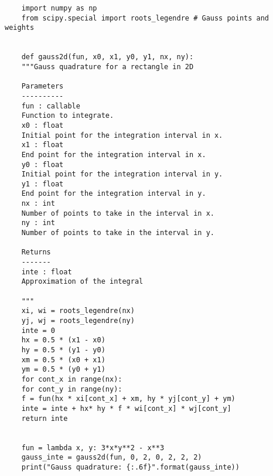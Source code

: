 \begin{mdframed}[linecolor=black,
	topline=true,
	bottomline=true,
	leftline=false,
	rightline=false]
	\begin{verbatim}
	import numpy as np
	from scipy.special import roots_legendre # Gauss points and weights
	
	
	def gauss2d(fun, x0, x1, y0, y1, nx, ny):
	"""Gauss quadrature for a rectangle in 2D
	
	Parameters
	----------
	fun : callable
	Function to integrate.
	x0 : float
	Initial point for the integration interval in x.
	x1 : float
	End point for the integration interval in x.
	y0 : float
	Initial point for the integration interval in y.
	y1 : float
	End point for the integration interval in y.
	nx : int
	Number of points to take in the interval in x.
	ny : int
	Number of points to take in the interval in y.
	
	Returns
	-------
	inte : float
	Approximation of the integral
	
	"""
	xi, wi = roots_legendre(nx)
	yj, wj = roots_legendre(ny)
	inte = 0
	hx = 0.5 * (x1 - x0)
	hy = 0.5 * (y1 - y0)
	xm = 0.5 * (x0 + x1)
	ym = 0.5 * (y0 + y1)
	for cont_x in range(nx):
	for cont_y in range(ny):
	f = fun(hx * xi[cont_x] + xm, hy * yj[cont_y] + ym)
	inte = inte + hx* hy * f * wi[cont_x] * wj[cont_y]
	return inte
	
	
	fun = lambda x, y: 3*x*y**2 - x**3
	gauss_inte = gauss2d(fun, 0, 2, 0, 2, 2, 2)
	print("Gauss quadrature: {:.6f}".format(gauss_inte))
	\end{verbatim}
\end{mdframed}

